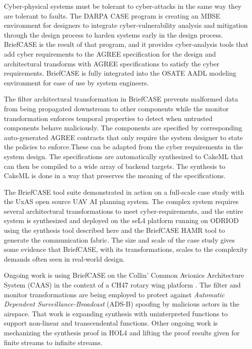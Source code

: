 Cyber-physical systems must be tolerant to cyber-attacks in the same way they are tolerant to faults. The DARPA CASE program is creating an MBSE environment for designers to integrate cyber-vulnerability analysis and mitigation through the design process to harden systems early in the design process. BriefCASE is the result of that program, and it provides cyber-analysis tools that add cyber requirements to the AGREE specification for the design and architectural transforms with AGREE specifications to satisfy the cyber requirements. BriefCASE is fully integrated into the OSATE AADL modeling environment for ease of use by system engineers.

The filter architectural transformation in BriefCASE prevents malformed data from being propagated downstream to other components while the monitor transformation enforces temporal properties to detect when untrusted components behave maliciously. The components are specified by corresponding auto-generated AGREE contracts that only require the system designer to state the policies to enforce.These can be adapted from the cyber requirements in the system design. The specifications are automatically synthesized to CakeML that can then be compiled to a wide array of backend targets. The synthesis to CakeML is done in a way that preserves the meaning of the specifications.

The BriefCASE tool suite demonstrated in action on a full-scale case study with the UxAS open source UAV AI planning system. The complex system requires several architectural transformations to meet cyber-requirements, and the entire system is synthesized and deployed on the seL4 platform running on ODRIOD using the synthesis tool described here and the BriefCASE HAMR tool to generate the communication fabric. The size and scale of the case study gives some evidence that BriefCASE, with its transformations, scales to the complexity demands often seen in real-world design.

Ongoing work is using BriefCASE on the Collin' Common Avionics Architecture System (CAAS) in the context of a CH47 rotary wing platform \cite{caas}. The filter and monitor transformations are being employed to protect against \emph{Automatic Dependent Surveillance-Broadcast} (ADS-B) spoofing by malicious actors in the airspace. That work is expanding synthesis with uninterpreted functions to support non-linear and transcendental functions. Other ongoing work is mechanizing the synthesis proof in HOL4 and lifting the proof results given for finite streams to infinite streams.